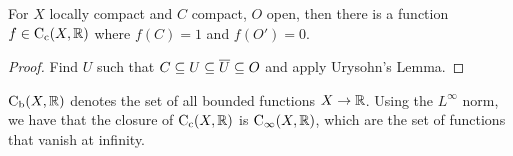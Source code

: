 \begin{proposition}
    For $X$ locally compact and $C$ compact, $O$ open, then there is a function $f \in \mathrm C_{\mathrm c}(X, \mathbb R)$ where $f(C) = 1$ and $f(O') = 0$.
\end{proposition}

\begin{proof}
    Find $U$ such that $C \subseteq U \subseteq \overline U \subseteq O$ and apply Urysohn's Lemma.
\end{proof}

\begin{definition}
    $\mathrm{C}_\mathrm{b}(X, \mathbb R)$ denotes the set of all bounded functions $X \to \mathbb R$. Using the $L^\infty$ norm, we have that the closure of $\mathrm C_{\mathrm c}(X, \mathbb R)$ is $\mathrm C_\infty(X, \mathbb R)$, which are the set of functions that vanish at infinity.
\end{definition}